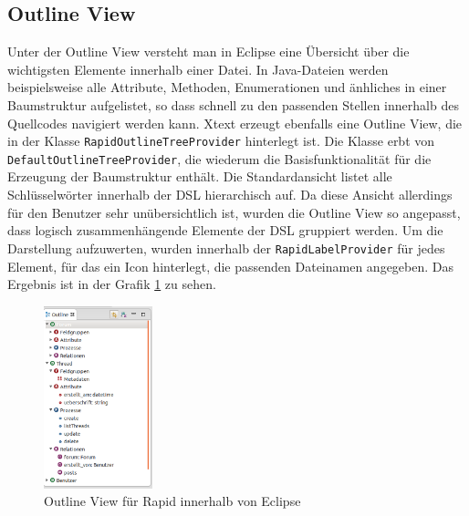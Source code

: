 \documentclass[a4paper,12pt]{scrreprt}
\begin{document}
\subsection{Outline View}
Unter der Outline View versteht man in Eclipse eine Übersicht über die wichtigsten Elemente innerhalb einer Datei. In Java-Dateien werden beispielsweise alle Attribute, Methoden, Enumerationen und änhliches in einer Baumstruktur aufgelistet, so dass schnell zu den pass\-en\-den Stellen innerhalb des Quellcodes navigiert werden kann.
Xtext erzeugt ebenfalls eine Outline View, die in der Klasse \texttt{RapidOutlineTreeProvider} hinterlegt ist. Die Klasse erbt von \texttt{DefaultOutlineTreeProvider}, die wiederum die Basisfunktionalität für die Erzeugung der Baumstruktur enthält. Die Standardansicht listet alle Schlüssel\-wörter innerhalb der DSL hierarchisch auf. Da diese Ansicht allerdings für den Benutzer sehr un\-über\-sichtlich ist, wurden die Outline View so angepasst, dass logisch zusammenhängende Elemente der DSL gruppiert werden. Um die Darstellung aufzuwerten, wurden innerhalb der \texttt{RapidLabelProvider} für jedes Element, für das ein Icon hinterlegt, die passenden Dateinamen an\-ge\-geben. Das Ergebnis ist in der Grafik \ref{fig:outline-view} zu sehen.
\begin{figure}[h]
	\centering
		\includegraphics[height=200px]{img/outline-view.png}
		\caption{Outline View für Rapid innerhalb von Eclipse}
		\label{fig:outline-view}
\end{figure}
\end{document}

